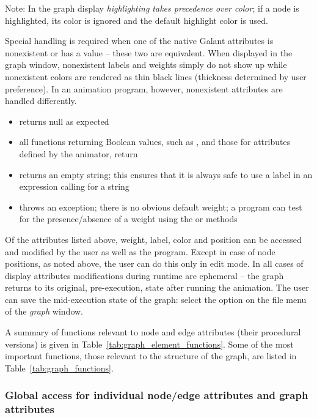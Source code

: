 Note: In the graph display \emph{highlighting takes precedence over color};
if a node is highlighted, its color is ignored and the default highlight
color is used.

Special handling is required when one of the native Galant attributes
is nonexistent or has a
 value -- these two are equivalent.
When displayed in the graph window, nonexistent labels and weights simply do
not show up while nonexistent colors are rendered as thin black lines
(thickness determined by user preference).
In an animation program, however, nonexistent attributes are handled
differently.
\begin{itemize}
\item {} returns null as expected
\item all functions returning Boolean values, such as ,
   and those for attributes defined by the animator, return
\item {} returns an empty string; this ensures that it is always
  safe to use a label in an expression calling for a string
\item {} throws an exception; there is no obvious default
  weight; a program can test for the presence/absence of a weight using the
   or  methods
\end{itemize}

Of the attributes listed above, weight, label, color and position can be
accessed and modified by the user as well as the program.
Except in case of node positions, as noted above,
the user can do this only in edit mode.
In all cases of display attributes
modifications during runtime are ephemeral
-- the graph returns to its original, pre-execution, state after running the
animation.
The user can save the mid-execution state of the graph:
select the  option on the file menu of the
\emph{graph} window.



A summary of functions relevant to node and edge attributes (their procedural versions)
is given in Table~\ref{tab:graph_element_functions}.
Some of the most important functions, those relevant to the structure of the
graph, are listed in Table~\ref{tab:graph_functions}.

\subsubsection{Global access for individual node/edge attributes and graph attributes}

